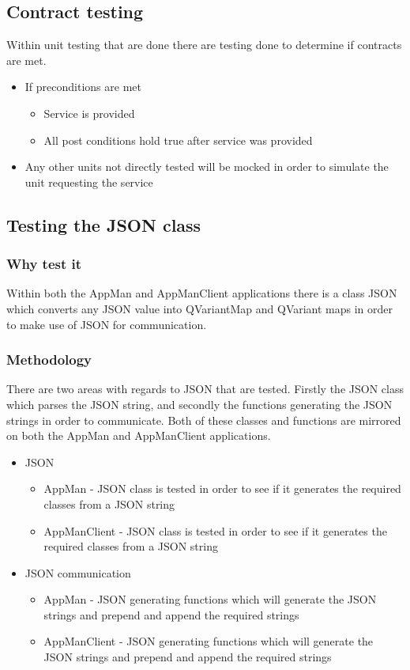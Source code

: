 \documentclass[a4paper,12pt,final]{article}
\begin{document}
\subsection{Contract testing}
Within unit testing that are done there are testing done to determine if contracts are met. 
\begin{itemize}
\item If preconditions are met
\begin{itemize}
\item Service is provided
\item All post conditions hold true after service was provided
\end{itemize}
\item Any other units not directly tested will be mocked in order to simulate the unit requesting the service
\end{itemize}



\subsection{Testing the JSON class}
\subsubsection{Why test it}
Within both the AppMan and AppManClient applications there is a class JSON which converts any JSON value into QVariantMap and QVariant maps in order to make use of JSON for communication.
\subsubsection{Methodology}
There are two areas with regards to JSON that are tested. Firstly the JSON class which parses the JSON string, and secondly the functions generating the JSON strings in order to communicate. Both of these classes and functions are mirrored on both the AppMan and AppManClient applications.
\begin{itemize}
\item JSON

\begin{itemize}
\item AppMan - JSON class is tested in order to see if it generates the required classes from a JSON string
\item AppManClient - JSON class is tested in order to see if it generates the required classes from a JSON string
\end{itemize}

\item JSON communication
\begin{itemize}
\item AppMan - JSON generating functions which will generate the JSON strings and prepend and append the required strings
\item AppManClient - JSON generating functions which will generate the JSON strings and prepend and append the required strings
\end{itemize}

\end{itemize}
\end{document}
